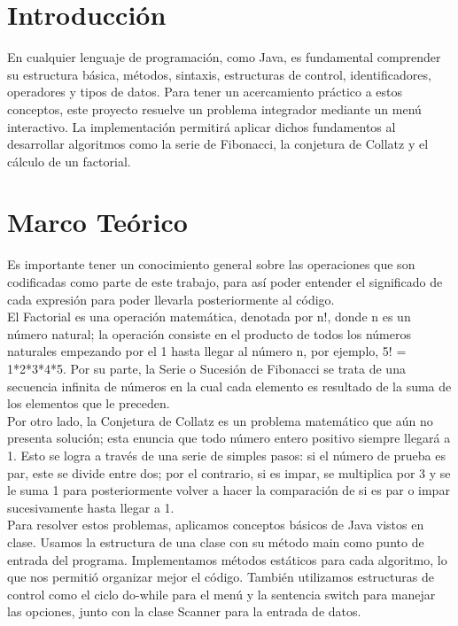 \documentclass[letterpaper,12pt,oneside]{article}
\begin{document}
\begin{titlepage}
    
	\end{titlepage}
 
\tableofcontents
\clearpage
    

\section{Introducción} 
En cualquier lenguaje de programación, como Java, es fundamental comprender su estructura básica, métodos, sintaxis, estructuras de control, identificadores, operadores y tipos de datos. Para tener un acercamiento práctico a estos conceptos, este proyecto resuelve un problema integrador mediante un menú interactivo. La implementación permitirá aplicar dichos fundamentos al desarrollar algoritmos como la serie de Fibonacci, la conjetura de Collatz y el cálculo de un factorial. 
 

\section{Marco Teórico}
Es importante tener un conocimiento general sobre las operaciones que son codificadas como parte de este trabajo, para así poder entender el significado de cada expresión para poder llevarla posteriormente al código. \\
El Factorial es una operación matemática, denotada por n!, donde n es un número natural; la operación consiste en el producto de todos los números naturales empezando por el 1 hasta llegar al número n, por ejemplo, 5! = 1*2*3*4*5.
Por su parte, la Serie o Sucesión de Fibonacci se trata de una secuencia infinita de números en la cual cada elemento es resultado de la suma de los elementos que le preceden.\\
Por otro lado, la Conjetura de Collatz es un problema matemático que aún no presenta solución; esta enuncia que todo número entero positivo siempre llegará a 1. Esto se logra a través de una serie de simples pasos: si el número de prueba es par, este se divide entre dos; por el contrario, si es impar, se multiplica por 3 y se le suma 1 para posteriormente volver a hacer la comparación de si es par o impar sucesivamente hasta llegar a 1. \\
Para resolver estos problemas, aplicamos conceptos básicos de Java vistos en clase. Usamos la estructura de una clase con su método main como punto de entrada del programa. Implementamos métodos estáticos para cada algoritmo, lo que nos permitió organizar mejor el código. También utilizamos estructuras de control como el ciclo do-while para el menú y la sentencia switch para manejar las opciones, junto con la clase Scanner para la entrada de datos.
\end{document}
